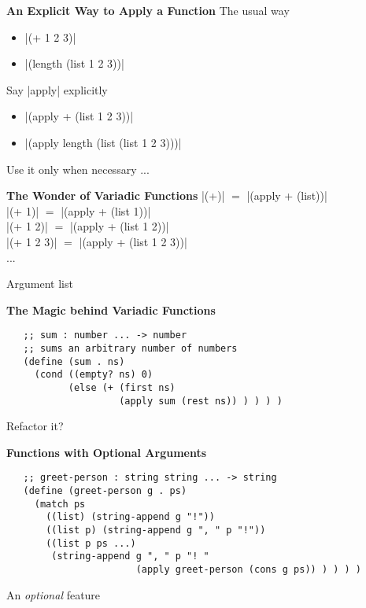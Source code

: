 \documentclass[14pt]{beamer}
\begin{document}
\begin{frame}[fragile]{\bf An Explicit Way to Apply a Function}
 The usual way
 \begin{itemize}
  \item {}|(+ 1 2 3)|
  \item {}|(length (list 1 2 3))|
 \end{itemize}

 \pause

 Say |apply| explicitly
 \begin{itemize}
  \item {}|(apply + (list 1 2 3))|
  \pause
  \item {}|(apply length (list (list 1 2 3)))|
 \end{itemize}

 Use it only when necessary ...
\end{frame}

\begin{frame}[fragile]{\bf The Wonder of Variadic Functions}
 |(+)| $=$ |(apply + (list))| \\
 \pause
 |(+ 1)| $=$ |(apply + (list 1))| \\
 \pause
 |(+ 1 2)| $=$ |(apply + (list 1 2))| \\
 \pause
 |(+ 1 2 3)| $=$ |(apply + (list 1 2 3))| \\
 ... 

 \pause
 Argument list
\end{frame}

\begin{frame}[fragile]{\bf The Magic behind Variadic Functions}\
 {\footnotesize
  \begin{verbatim}
   ;; sum : number ... -> number
   ;; sums an arbitrary number of numbers
   (define (sum . ns)
     (cond ((empty? ns) 0)
           (else (+ (first ns)
                    (apply sum (rest ns)) ) ) ) )
  \end{verbatim}
 } 

 \pause
 Refactor it?
\end{frame}

\begin{frame}[fragile]{\bf Functions with Optional Arguments}\
 {\scriptsize
  \begin{verbatim}
   ;; greet-person : string string ... -> string
   (define (greet-person g . ps)
     (match ps
       ((list) (string-append g "!"))
       ((list p) (string-append g ", " p "!"))
       ((list p ps ...)
        (string-append g ", " p "! "
                       (apply greet-person (cons g ps)) ) ) ) )
  \end{verbatim}
 }

 \pause

 An \emph{optional} feature
\end{frame}
\end{document}
